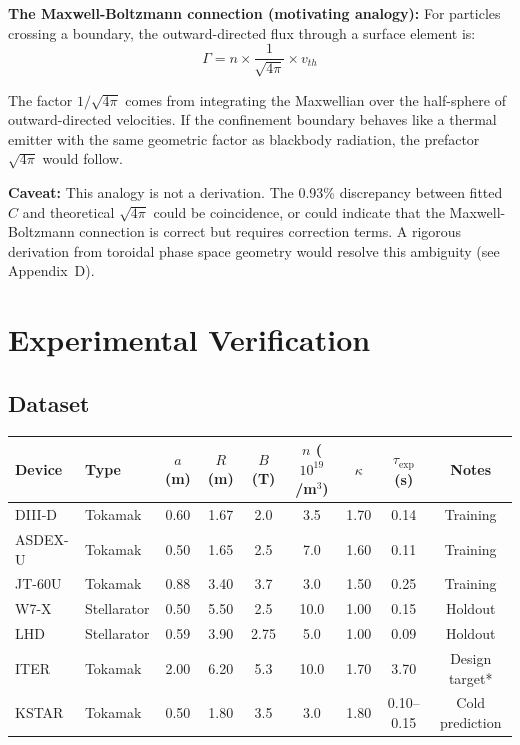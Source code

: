 \documentclass[11pt,letterpaper]{article}
\begin{document}
\textbf{The Maxwell-Boltzmann connection (motivating analogy):} For particles crossing a boundary, the outward-directed flux through a surface element is:
\begin{equation}
\Gamma = n \times \frac{1}{\sqrt{4\pi}} \times v_{th}
\end{equation}

The factor $1/\sqrt{4\pi}$ comes from integrating the Maxwellian over the half-sphere of outward-directed velocities. If the confinement boundary behaves like a thermal emitter with the same geometric factor as blackbody radiation, the prefactor $\sqrt{4\pi}$ would follow.

\textbf{Caveat:} This analogy is not a derivation. The 0.93\% discrepancy between fitted $C$ and theoretical $\sqrt{4\pi}$ could be coincidence, or could indicate that the Maxwell-Boltzmann connection is correct but requires correction terms. A rigorous derivation from toroidal phase space geometry would resolve this ambiguity (see Appendix~D).

\section{Experimental Verification}

\subsection{Dataset}

\begin{center}
\small
\begin{tabular}{llccccccc}
\toprule
\textbf{Device} & \textbf{Type} & $a$ (m) & $R$ (m) & $B$ (T) & $n$ ($10^{19}$/m$^3$) & $\kappa$ & $\tau_{\exp}$ (s) & \textbf{Notes} \\
\midrule
DIII-D & Tokamak & 0.60 & 1.67 & 2.0 & 3.5 & 1.70 & 0.14 & Training \\
ASDEX-U & Tokamak & 0.50 & 1.65 & 2.5 & 7.0 & 1.60 & 0.11 & Training \\
JT-60U & Tokamak & 0.88 & 3.40 & 3.7 & 3.0 & 1.50 & 0.25 & Training \\
W7-X & Stellarator & 0.50 & 5.50 & 2.5 & 10.0 & 1.00 & 0.15 & Holdout \\
LHD & Stellarator & 0.59 & 3.90 & 2.75 & 5.0 & 1.00 & 0.09 & Holdout \\
ITER & Tokamak & 2.00 & 6.20 & 5.3 & 10.0 & 1.70 & 3.70 & Design target* \\
KSTAR & Tokamak & 0.50 & 1.80 & 3.5 & 3.0 & 1.80 & 0.10--0.15 & Cold prediction \\
\bottomrule
\end{tabular}
\end{center}
\end{document}
